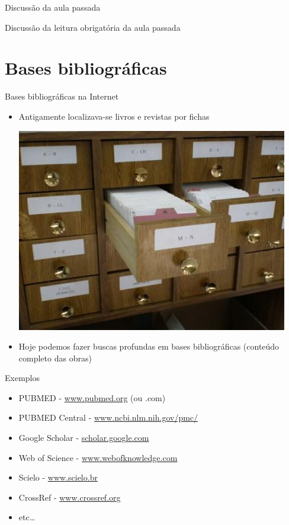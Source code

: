 \documentclass{beamer}
\begin{document}

\begin{frame}{Discussão da aula passada}
  \begin{block}{}
    Discussão da leitura obrigatória da aula passada
  \end{block}
\end{frame}

\section{Bases bibliográficas}

\begin{frame}{Bases bibliográficas na Internet}
  \begin{itemize}
    \footnotesize
  \item Antigamente localizava-se livros e revistas por fichas
    \begin{center}
      \includegraphics[height=.45\textheight]{Busca/fichas}
    \end{center}

  \item Hoje podemos fazer buscas profundas em bases bibliográficas
    (conteúdo completo das obras)
  \end{itemize}
\end{frame}

\begin{frame}{Exemplos}
  \begin{itemize}
    \footnotesize
  \item \alert{PUBMED} - \url{www.pubmed.org} (ou .com)
  \item \alert{PUBMED Central} - \url{www.ncbi.nlm.nih.gov/pmc/}
  \item \alert{Google Scholar} - \url{scholar.google.com}
  \item Web of Science - \url{www.webofknowledge.com}
  \item Scielo - \url{www.scielo.br}
  \item CrossRef - \url{www.crossref.org}
  \item etc\ldots
  \end{itemize}
\end{frame}
\end{document}
